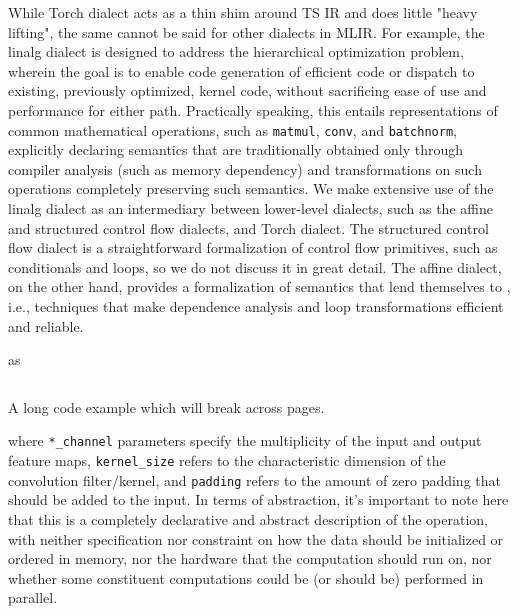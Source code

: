 While Torch dialect acts as a thin shim around TS IR and does little "heavy lifting", the same cannot be said for other dialects in MLIR.
For example, the linalg dialect is designed to address the hierarchical optimization problem, wherein the goal is to enable code generation of efficient code or dispatch to existing, previously optimized, kernel code, without sacrificing ease of use and performance for either path.
Practically speaking, this entails representations of common mathematical operations, such as \texttt{matmul}, \texttt{conv}, and \texttt{batchnorm}, explicitly declaring semantics that are traditionally obtained only through compiler analysis (such as memory dependency) and transformations on such operations completely preserving such semantics.
We make extensive use of the linalg dialect as an intermediary between lower-level dialects, such as the affine and structured control flow dialects, and Torch dialect.
The structured control flow dialect is a straightforward formalization of control flow primitives, such as conditionals and loops, so we do not discuss it in great detail.
The affine dialect, on the other hand, provides a formalization of semantics that lend themselves to , i.e., techniques that make dependence analysis and loop transformations efficient and reliable.

 as  
\begin{longlisting}
	\inputminted{python}{sources/conv2d.py}
	\caption[Long Code Example]{A long code example which will break across pages.}
	\label{lst:long}
\end{longlisting}
\noindent where \texttt{*_channel} parameters specify the multiplicity of the input and output feature maps, \texttt{kernel_size} refers to the characteristic dimension of the convolution filter/kernel, and \texttt{padding} refers to the amount of zero padding that should be added to the input.
In terms of abstraction, it's important to note here that this is a completely declarative and abstract description of the operation, with neither specification nor constraint on how the data should be initialized or ordered in memory, nor the hardware that the computation should run on, nor whether some constituent computations could be (or should be) performed in parallel.

